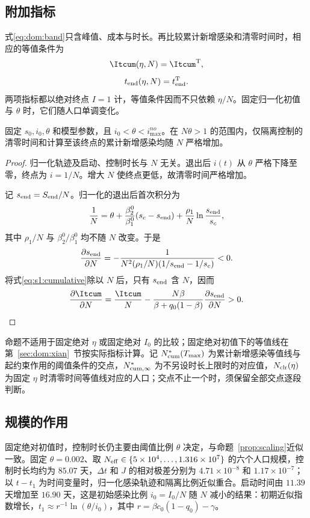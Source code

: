\subsection{附加指标}
\label{sec:dom:extra}
式\eqref{eq:dom:band}只含峰值、成本与时长。再比较累计新增感染和清零时间时，相应的等值条件为
\begin{equation}
\Itcum(\eta,N)=\Itcum^{\rm T},
\label{eq:dom:cumarc}
\end{equation}
\begin{equation}
t_{\rm end}(\eta,N)=t_{\rm end}^{\rm T}.
\label{eq:dom:clrarc}
\end{equation}
两项指标都以绝对终点 $I=1$ 计，等值条件因而不只依赖 $\eta/N$。固定归一化初值与 $\theta$ 时，它们随人口单调变化。
\begin{proposition}
\label{prop:reference-population}
固定 $s_0,i_0,\theta$ 和模型参数，且 $i_0<\theta<i_{\max}^{no}$。在 $N\theta>1$ 的范围内，仅隔离控制的清零时间和计算至该终点的累计新增感染均随 $N$ 严格增加。
\end{proposition}
\begin{proof}
归一化轨迹及启动、控制时长与 $N$ 无关。退出后 $i(t)$ 从 $\theta$ 严格下降至零，终点为 $i=1/N$。增大 $N$ 使终点更低，故清零时间严格增加。

记 $s_{\rm end}=S_{\rm end}/N$。归一化的退出后首次积分为
\[
\frac1N=\theta+\frac{\beta_2^0}{\beta_1^0}(s_c-s_{\rm end})
+\frac{\rho_1}{N}\ln\frac{s_{\rm end}}{s_c},
\]
其中 $\rho_1/N$ 与 $\beta_2^0/\beta_1^0$ 均不随 $N$ 改变。于是
\[
\frac{\partial s_{\rm end}}{\partial N}
=-\frac1{N^2(\rho_1/N)(1/s_{\rm end}-1/s_c)}<0.
\]
将式\eqref{eq:s1:cumulative}除以 $N$ 后，只有 $s_{\rm end}$ 含 $N$，因而
\[
\frac{\partial\Itcum}{\partial N}
=\frac{\Itcum}{N}
-\frac{N\beta}{\beta+q_0(1-\beta)}\frac{\partial s_{\rm end}}{\partial N}>0.\qedhere
\]
\end{proof}
命题不适用于固定绝对 $\eta$ 或固定绝对 $I_0$ 的比较；固定绝对初值下的等值线在第~\ref{sec:dom:xian}~节按实际指标计算。记 $N^*_{\rm cum}(T_{\max})$ 为累计新增感染等值线与起约束作用的阈值条件的交点，$N^*_{\rm cum,\infty}$ 为不另设时长上限时的对应值，$N_{\rm clr}(\eta)$ 为固定 $\eta$ 时清零时间等值线对应的人口；交点不止一个时，须保留全部交点逐段判断。

\subsection{规模的作用}
\label{sec:scaling}
固定绝对初值时，控制时长仍主要由阈值比例 $\theta$ 决定，与命题~\ref{prop:scaling}近似一致。固定 $\theta=0.002$、取 $N_{\rm eff}\in\{5\times10^4,\dots,1.316\times10^7\}$ 的六个人口规模，控制时长均约为 $85.07$ 天，$\Delta t$ 和 $J$ 的相对极差分别为 $4.71\times10^{-8}$ 和 $1.17\times10^{-7}$；以 $t-t_1$ 为时间变量时，归一化感染轨迹和隔离比例近似重合。启动时间由 $11.39$ 天增加至 $16.90$ 天，这是初始感染比例 $i_0=I_0/N$ 随 $N$ 减小的结果：初期近似指数增长，$t_1\approx r^{-1}\ln(\theta/i_0)$，其中 $r=\beta c_0(1-q_0)-\gamma$。

